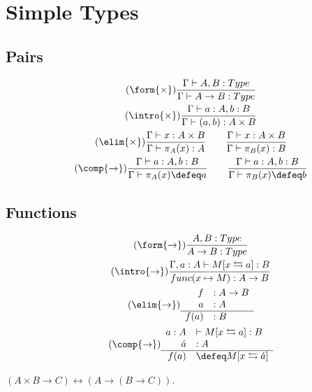 \section{Simple Types}

\subsection{Pairs}
\begin{gather}
    \tag{$\form{\times}$}
    \frac{\Gamma\vdash A,B:Type}{\Gamma\vdash A\to B:Type}\\
    \tag{$\intro{\times}$}
    \frac{
        \Gamma\vdash a:A, b:B
    }{
        \Gamma \vdash (a,b):A\times B
    }\\
    \tag{$\elim{\times}$}
    \frac{
        \Gamma\vdash x:A\times B
    }{
        \Gamma \vdash \pi_A(x):A
    }
    \qquad
    \frac{
        \Gamma\vdash x:A\times B
    }{
        \Gamma \vdash \pi_B(x):B
    }\\
    \tag{$\comp{\to}$}
    \frac{
        \Gamma\vdash a:A, b:B
    }{
        \Gamma \vdash \pi_A(x)\defeq a
    }
    \qquad
    \frac{
        \Gamma\vdash a:A, b:B
    }{
        \Gamma \vdash \pi_B(x)\defeq b
    }
\end{gather}

\subsection{Functions}
\begin{gather}
    \tag{$\form{\to}$}
    \frac{A,B:Type}{A\to B:Type}\\
    \tag{$\intro{\to}$}
    \frac{
        \Gamma, a:A \vdash M[x\leftrightarrows a]:B
    }{
        func(x\mapsto M):A\to B
    }\\
    \tag{$\elim{\to}$}
    \begin{array}{rl}
        f&:A\to B\\
        a&:A\\
    \hline
        f(a)&:B
    \end{array}\\
    \tag{$\comp{\to}$}
    \begin{array}{rl}
        a:A&\vdash M[x\leftrightarrows a]:B\\
        \acute{a}&:A\\
    \hline
        f(a)&\defeq M[x\leftrightarrows \acute{a}]
    \end{array}
\end{gather}


\begin{theorem}
    $(A\times B\to C)\longleftrightarrow (A\to (B\to C))$.
\end{theorem}